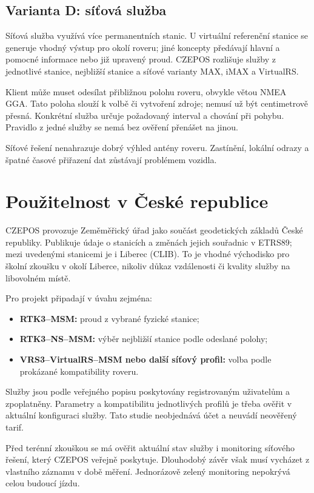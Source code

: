 \documentclass[11pt,a4paper]{article}
\begin{document}
\subsection{Varianta D: síťová služba}
Síťová služba využívá více permanentních stanic. U virtuální referenční stanice se generuje vhodný výstup pro okolí roveru; jiné koncepty předávají hlavní a pomocné informace nebo již upravený proud. CZEPOS rozlišuje služby z jednotlivé stanice, nejbližší stanice a síťové varianty MAX, iMAX a VirtualRS.\cite{czepos-services}

Klient může muset odesílat přibližnou polohu roveru, obvykle větou NMEA GGA. Tato poloha slouží k volbě či vytvoření zdroje; nemusí už být centimetrově přesná. Konkrétní služba určuje požadovaný interval a chování při pohybu. Pravidlo z jedné služby se nemá bez ověření přenášet na jinou.

Síťové řešení nenahrazuje dobrý výhled antény roveru. Zastínění, lokální odrazy a špatné časové přiřazení dat zůstávají problémem vozidla.

\section{Použitelnost v České republice}
CZEPOS provozuje Zeměměřický úřad jako součást geodetických základů České republiky. Publikuje údaje o stanicích a změnách jejich souřadnic v ETRS89; mezi uvedenými stanicemi je i Liberec (CLIB).\cite{czepos-network} To je vhodné východisko pro školní zkoušku v okolí Liberce, nikoliv důkaz vzdálenosti či kvality služby na libovolném místě.

Pro projekt připadají v úvahu zejména:
\begin{itemize}
\item \textbf{RTK3--MSM:} proud z vybrané fyzické stanice;
\item \textbf{RTK3--NS--MSM:} výběr nejbližší stanice podle odeslané polohy;
\item \textbf{VRS3--VirtualRS--MSM nebo další síťový profil:} volba podle prokázané kompatibility roveru.
\end{itemize}
Služby jsou podle veřejného popisu poskytovány registrovaným uživatelům a zpoplatněny. Parametry a kompatibilitu jednotlivých profilů je třeba ověřit v aktuální konfiguraci služby.\cite{czepos-services} Tato studie neobjednává účet a neuvádí neověřený tarif.

Před terénní zkouškou se má ověřit aktuální stav služby i monitoring síťového řešení, který CZEPOS veřejně poskytuje.\cite{czepos-status,czepos-quality} Dlouhodobý závěr však musí vycházet z vlastního záznamu v době měření. Jednorázově zelený monitoring nepokrývá celou budoucí jízdu.
\end{document}
